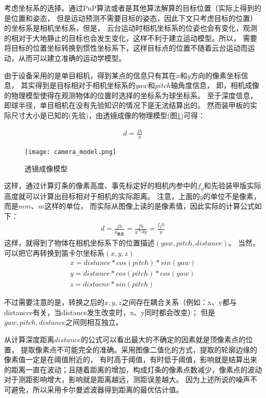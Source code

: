 考虑坐标系的选择。通过PnP算法或者是其他算法解算的目标位置（实际上得到的是位置和姿态，
但是运动预测不需要目标的姿态，因此下文只考虑目标的位置）的坐标系是相机坐标系，但是，
云台运动时相机坐标系的位姿也会有变化，观测的相对于大地静止的目标也会发生变化，这样不利于建立运动模型。所以，
需要将目标的位置坐标转换到惯性坐标系下，这样目标点的位置不随着云台运动而运动，从而可以建立准确的运动学模型。\par
由于设备采用的是单目相机，得到某点的信息只有其在$x$和$y$方向的像素坐标信息，
其实得到是目标相对于相机坐标系的$yaw$和$pitch$轴角度信息，
即，相机成像的物理模型使得在观测物体的位置时选择的坐标系为球坐标系。
至于深度信息，即球半径，单目相机在没有先验知识的情况下是无法结算出的。
然而装甲板的实际尺寸大小是已知的(先验)，由透镜成像的物理模型(图\ref{透镜成像模型})可得：\par
\begin{gather}
    d = \frac{fh}{y} 
\end{gather}

\begin{figure}[H]
    \centering
    \texttt{[image: camera\_model.png]} 
    \caption{透镜成像模型}
    \label{透镜成像模型} 
\end{figure}    
这样，通过计算灯条的像素高度、事先标定好的相机内参中的$f_y$和先验装甲版实际高度就可以计算出目标相对于相机的实际距离。
注意，上面的$y$的单位不是像素，而是$mm$、$m$这样的单位，
而实际从图像上读的是像素值，因此实际的计算公式如下：
\begin{gather}
    d=\frac{fh}{y_{像素}}=\frac{fh}{y*dy}=\frac{f_yh}{y}
\end{gather}
这样，就得到了物体在相机坐标系下的位置描述$(yaw,pitch, distance)$。
当然，可以把它再转换到笛卡尔坐标系$(x,y,z)$
\begin{gather}
    x = distance*cos(pitch)*sin(yaw) \\
    y = distance*cos(pitch)*cos(yaw) \\
    z = distacne * sin(pitch)
\end{gather} \par
不过需要注意的是，转换之后的$x,y,z$之间存在耦合关系（例如：x、y都与distancce有关，当distance发生改变时，x、y同时都会改变）；
但是$yaw,pitch,distance$之间则相互独立。\par

从计算深度距离$distance$的公式可以看出最大的不确定的因素就是顶像素点的位置，
提取像素点不可能完全的准确。采用图像二值化的方式，提取的轮廓边缘的像素值一定是在阈值附近的，
有时高于阈值，有时低于阈值，影响就是结算出来的距离一直在波动；且随着距离的增加，构成灯条的像素点数减少，像素点的波动对于测距影响增大，影响就是距离越远，测距误差越大。
因为上述所说的噪声不可避免，所以采用卡尔曼滤波器得到距离的最优估计值。\par


